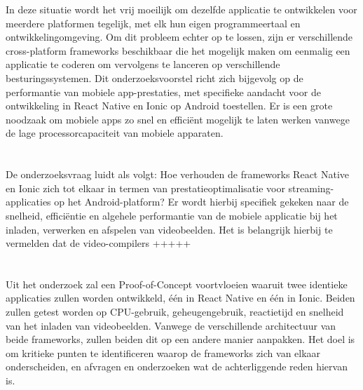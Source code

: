 In deze situatie wordt het vrij moeilijk om dezelfde applicatie te ontwikkelen voor meerdere platformen tegelijk, met elk hun eigen programmeertaal en ontwikkelingomgeving. Om dit probleem echter op te lossen, zijn er verschillende cross-platform frameworks beschikbaar die het mogelijk maken om eenmalig een applicatie te coderen om vervolgens te lanceren op verschillende besturingssystemen. Dit onderzoeksvoorstel richt zich bijgevolg op de performantie van mobiele app-prestaties, met specifieke aandacht voor de ontwikkeling in React Native en Ionic op Android toestellen. Er is een grote noodzaak om mobiele apps zo snel en efficiënt mogelijk te laten werken vanwege de lage processorcapaciteit van mobiele apparaten.

\section{}%
\label{sec:onderzoeksvraag}


De onderzoeksvraag luidt als volgt: Hoe verhouden de frameworks React Native en Ionic zich tot elkaar in termen van prestatieoptimalisatie voor streaming-applicaties op het Android-platform? Er wordt hierbij specifiek gekeken naar de snelheid, efficiëntie en algehele performantie van de mobiele applicatie bij het inladen, verwerken en afspelen van videobeelden. Het is belangrijk hierbij te vermelden dat de video-compilers +++++

\section{}%
\label{sec:onderzoeksdoelstelling}


Uit het onderzoek zal een Proof-of-Concept voortvloeien waaruit twee identieke applicaties zullen worden ontwikkeld, één in React Native en één in Ionic. Beiden zullen getest worden op CPU-gebruik, geheugengebruik, reactietijd en snelheid van het inladen van videobeelden. Vanwege de verschillende architectuur van beide frameworks, zullen beiden dit op een andere manier aanpakken. Het doel is om kritieke punten te identificeren waarop de frameworks zich van elkaar onderscheiden, en afvragen en onderzoeken wat de achterliggende reden hiervan is.

